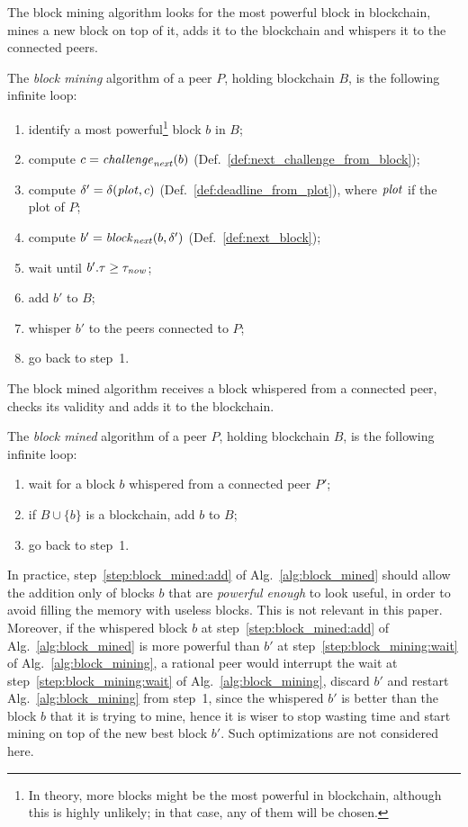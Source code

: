 The block mining algorithm looks for the most powerful block in blockchain,
mines a new block on top of it, adds it to the blockchain and whispers it to the connected peers.
%
\begin{alg}\label{alg:block_mining}
  The \emph{block mining} algorithm of a peer $P$, holding blockchain $B$,
  is the following infinite loop:
  \begin{enumerate}
  \item identify a most powerful\footnote{In theory, more blocks might be the most powerful in blockchain, although this is highly unlikely; in that case, any of them will be chosen.} block $b$ in $B$;
  \item compute $c={\mathit{challenge}}_{\mathit{next}}(b)$ (Def.~\ref{def:next_challenge_from_block});
  \item compute $\delta'=\delta({\mathit{plot}},c)$ (Def.~\ref{def:deadline_from_plot}), where ${\mathit{plot}}$
    if the plot of $P$;
  \item compute $b'={\mathit{block}}_{\mathit{next}}(b,\delta')$ (Def.~\ref{def:next_block});
  \item\label{step:block_mining:wait} wait until $b'.\tau\ge\tau_{\mathit{now}}$;
  \item\label{step:block_mining:add} add $b'$ to $B$;
  \item whisper $b'$ to the peers connected to $P$;
  \item go back to step~1.
  \end{enumerate}
\end{alg}
%
The block mined algorithm receives a block whispered from a connected peer, checks its validity
and adds it to the blockchain.
%
\begin{alg}\label{alg:block_mined}
  The \emph{block mined} algorithm of a peer $P$, holding blockchain $B$,
  is the following infinite loop:
  \begin{enumerate}
  \item wait for a block $b$ whispered from a connected peer $P'$;
  \item\label{step:block_mined:add} if $B\cup\{b\}$ is a blockchain, add $b$ to $B$;
  \item go back to step~1.
  \end{enumerate}
\end{alg}
%
In practice, step~\ref{step:block_mined:add} of Alg.~\ref{alg:block_mined} should
allow the addition only of blocks $b$ that are \emph{powerful enough} to look useful,
in order to avoid filling the memory with useless blocks. This is not relevant in this paper.
Moreover, if the whispered block $b$
at step~\ref{step:block_mined:add} of Alg.~\ref{alg:block_mined} is more
powerful than $b'$ at step~\ref{step:block_mining:wait} of Alg.~\ref{alg:block_mining},
a rational peer would interrupt the wait at step~\ref{step:block_mining:wait}
of Alg.~\ref{alg:block_mining}, discard $b'$ and restart Alg.~\ref{alg:block_mining}
from step~1, since the whispered $b'$ is better than the block $b$ that it is trying to mine,
hence it is wiser to stop wasting time and start mining on top of the new best block $b'$.
Such optimizations are not considered here.

